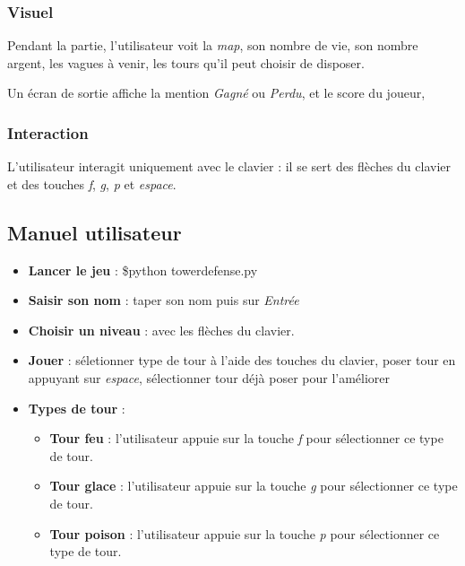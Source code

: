 \documentclass{scrartcl}
\begin{document}
		\subsubsection{Visuel}
		Pendant la partie, l'utilisateur voit la \emph{map}, son nombre de vie, son nombre argent, les vagues à venir, les tours qu'il peut choisir de disposer.
		
		\noindent Un écran de sortie affiche la mention \emph{Gagné} ou \emph{Perdu}, et le score du joueur, 
		\subsubsection{Interaction}
		L'utilisateur interagit uniquement avec le clavier : il se sert des flèches du clavier et des touches \emph{f}, \emph{g}, \emph{p} et \emph{espace}.

	\subsection{Manuel utilisateur}
	\begin{itemize}
		\item \textbf{Lancer le jeu} : \$python towerdefense.py
		\item \textbf{Saisir son nom} : taper son nom puis sur \emph{Entrée}
		\item \textbf{Choisir un niveau} : avec les flèches du clavier.
		\item \textbf{Jouer} : séletionner type de tour à l'aide des touches du clavier, poser tour en appuyant sur \emph{espace}, sélectionner tour déjà poser pour l'améliorer
		\item \textbf{Types de tour} : 
			\begin{itemize}
				\item \textbf{Tour feu} : l'utilisateur appuie sur la touche \emph{f} pour sélectionner ce type de tour.
				\item \textbf{Tour glace} : l'utilisateur appuie sur la touche \emph{g} pour sélectionner ce type de tour.
				\item \textbf{Tour poison} : l'utilisateur appuie sur la touche \emph{p} pour sélectionner ce type de tour.
			\end{itemize}
	\end{itemize}
\end{document}
